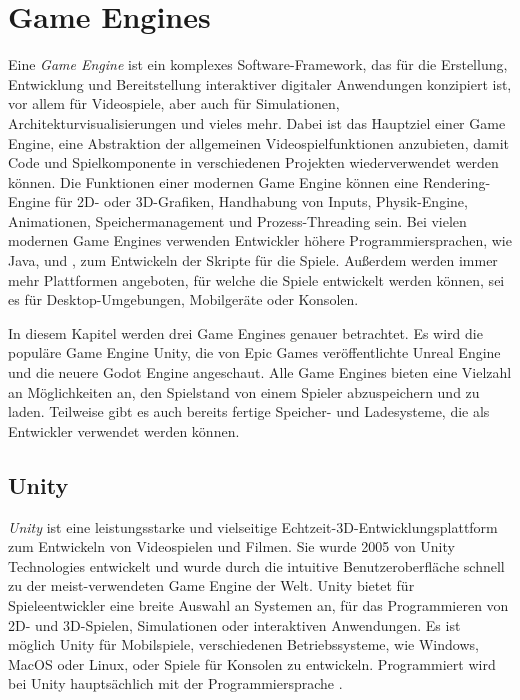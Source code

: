 \chapter{Game Engines}\label{ch:gameengines}
Eine \textit{Game Engine} ist ein komplexes Software-Framework, das für die Erstellung, Entwicklung und Bereitstellung interaktiver digitaler Anwendungen konzipiert ist, vor allem für Videospiele, aber auch für Simulationen, Architekturvisualisierungen und vieles mehr. Dabei ist das Hauptziel einer Game Engine, eine Abstraktion der allgemeinen Videospielfunktionen anzubieten, damit Code und Spielkomponente in verschiedenen Projekten wiederverwendet werden können. Die Funktionen einer modernen Game Engine können eine Rendering-Engine für 2D- oder 3D-Grafiken, Handhabung von Inputs, Physik-Engine, Animationen, Speichermanagement und Prozess-Threading sein. Bei vielen modernen Game Engines verwenden Entwickler höhere Programmiersprachen, wie Java, \cpp{} und \csharp{}, zum Entwickeln der Skripte für die Spiele.\cite{appacademyBestProgramming} Außerdem werden immer mehr Plattformen angeboten, für welche die Spiele entwickelt werden können, sei es für Desktop-Umgebungen, Mobilgeräte oder Konsolen.\cite{andrade2015game}

In diesem Kapitel werden drei Game Engines genauer betrachtet. Es wird die populäre Game Engine Unity\cite{vsmid2017comparison}, die von Epic Games veröffentlichte Unreal Engine und die neuere Godot Engine angeschaut. Alle Game Engines bieten eine Vielzahl an Möglichkeiten an, den Spielstand von einem Spieler abzuspeichern und zu laden. Teilweise gibt es auch bereits fertige Speicher- und Ladesysteme, die als Entwickler verwendet werden können.



\section{Unity}
\textit{Unity} ist eine leistungsstarke und vielseitige Echtzeit-3D-Entwicklungsplattform zum Entwickeln von Videospielen und Filmen. Sie wurde 2005 von Unity Technologies entwickelt und wurde durch die intuitive Benutzeroberfläche schnell zu der meist-verwendeten Game Engine der Welt. Unity bietet für Spieleentwickler eine breite Auswahl an Systemen an, für das Programmieren von 2D- und 3D-Spielen, Simulationen oder interaktiven Anwendungen. Es ist möglich Unity für Mobilspiele, verschiedenen Betriebssysteme, wie Windows, MacOS oder Linux, oder Spiele für Konsolen zu entwickeln. Programmiert wird bei Unity hauptsächlich mit der Programmiersprache \csharp{}.\cite{unityUnityEngine}\cite{vsmid2017comparison}

